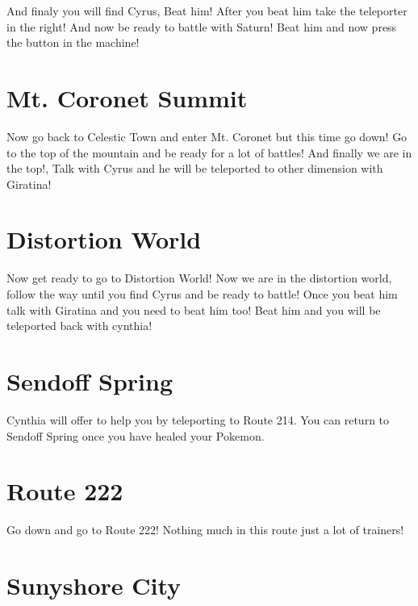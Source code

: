 \documentclass[11pt]{article}
\begin{document}
And finaly you will find Cyrus, Beat him!
After you beat him take the teleporter in the right!
And now be ready to battle with Saturn!
Beat him and now press the button in the machine!

\section{Mt. Coronet Summit}\label{sec:back-to-mt.-coronet}
Now go back to Celestic Town and enter Mt. Coronet but this time go down!
Go to the top of the mountain and be ready for a lot of battles!
And finally we are in the top!, Talk with Cyrus and he will be
teleported to other dimension with Giratina!



\section{Distortion World}\label{sec:distortion-world}
Now get ready to go to Distortion World!
Now we are in the distortion world, 
follow the way until you find Cyrus and be ready to battle!
Once you beat him talk with Giratina and you need to beat him too!
Beat him and you will be teleported back with cynthia!

\section{Sendoff Spring}\label{sec:sendoff-spring}
Cynthia will offer to help you by teleporting to Route 214.
You can return to Sendoff Spring once you have healed your Pokemon.





\section{Route 222}\label{sec:route-222}
Go down and go to Route 222!
Nothing much in this route just a lot of trainers!





\section{Sunyshore City}\label{sec:sunyshore-city}
\end{document}
